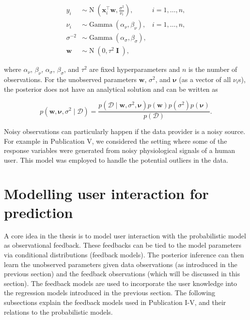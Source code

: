 \documentclass[dissertation,math,vertlayout,pdfa,colorlinks]{aaltoseries}
\newcommand{\bw}{\bm{w}}
\newcommand{\bD}{\mathcal{D}}
\DeclareMathOperator{\eye}{\textbf{I}}
\DeclareMathOperator{\normalpdf}{N}
\DeclareMathOperator{\gammapdf}{Gamma}
\newcommand{\tp}{^{\top}}
\begin{document}
	
\begin{align}\label{Eq:ard_Bayesian_regression}
y_i &\sim \normalpdf(\bm{x}_i\tp\bw,\frac{\sigma^2}{\nu_i}),  & i=1,\ldots,n,\\
\nu_i &\sim \gammapdf(\alpha_{\nu}, \beta_{\nu}), & i=1,\ldots,n,\nonumber \\
\sigma^{-2} &\sim \gammapdf(\alpha_{\sigma}, \beta_{\sigma}), \nonumber \\
\bw &\sim \normalpdf(0,\tau^2 \eye), \nonumber
\end{align}

\noindent where $\alpha_{\nu}$, $\beta_{\nu}$, $\alpha_{\sigma}$, $\beta_{\sigma}$, and $\tau^2$ are fixed hyperparameters and $n$ is the number of observations. For the unobserved parameters $\bw$, $\sigma^2$, and $\bm{\nu}$ (as a vector of all $\nu_i$s), the posterior does not have an analytical solution and can be written as

\begin{equation}\label{Eq:Bayes_rule_ARD}
p(\bw, \bm{\nu}, \sigma^2 \mid \bD) = \frac{p(\bD \mid \bw, \sigma^2, \bm{\nu})p(\bw)p(\sigma^2)p(\bm{\nu})}{p(\bD)}.
\end{equation} 

Noisy observations can particularly happen if the data provider is a noisy source. For example in Publication V, we considered the setting where some of the response variables were generated from noisy physiological signals of a human user. This model was employed to handle the potential outliers in the data. 



\section{Modelling user interaction for prediction}\label{prob_model_user}

A core idea in the thesis is to model user interaction with the probabilistic model as observational feedback. These feedbacks can be tied to the model parameters via conditional distributions (feedback models). The posterior inference can then learn the unobserved parameters given data observations (as introduced in the previous section) and the feedback observations (which will be discussed in this section). The feedback models are used to incorporate the user knowledge into the regression models introduced in the previous section. The following subsections explain the feedback models used in Publication I-V, and their relations to the probabilistic models.
\end{document}

